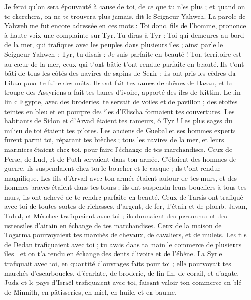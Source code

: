 \begin{multicols}{2}
Je ferai qu'on sera épouvanté à cause de toi, de ce que tu n'es plus ; et quand on te cherchera, on ne te trouvera plus jamais, dit le Seigneur Yahweh.
\VerseOne{}La parole de Yahweh me fut encore adressée en ces mots :
Toi donc, fils de l’homme, prononce à haute voix une complainte sur Tyr.
Tu diras à Tyr : Toi qui demeures au bord de la mer, qui trafiques avec les peuples dans plusieurs îles ; ainsi parle le Seigneur Yahweh : Tyr, tu disais : Je suis parfaite en beauté !
Ton territoire est au cœur de la mer, ceux qui t'ont bâtie t'ont rendue parfaite en beauté.
Ils t'ont bâti de tous les côtés des navires de sapins de Senir ; ils ont pris les cèdres du Liban pour te faire des mâts.
Ils ont fait tes rames de chênes de Basan, et la troupe des Assyriens a fait tes bancs d'ivoire, apporté des îles de Kittim.
Le fin lin d'Egypte, avec des broderies, te servait de voiles et de pavillon ; des étoffes teintes en bleu et en pourpre des îles d’Elischa formaient tes couvertures.
Les habitants de Sidon et d'Arvad étaient tes rameurs, ô Tyr ! Les plus sages du milieu de toi étaient tes pilotes.
Les anciens de Guebal et ses hommes experts furent parmi toi, réparant tes brèches ; tous les navires de la mer, et leurs mariniers étaient chez toi, pour faire l’échange de tes marchandises.
Ceux de Perse, de Lud, et de Puth servaient dans ton armée. C’étaient des hommes de guerre, ils suspendaient chez toi le bouclier et le casque ; ils t'ont rendue magnifique.
Les fils d'Arvad avec ton armée étaient autour de tes murs, et des hommes braves étaient dans tes tours ; ils ont suspendu leurs boucliers à tous tes murs, ils ont achevé de te rendre parfaite en beauté.
Ceux de Tarsis ont trafiqué avec toi de toutes sortes de richesses, d’argent, de fer, d’étain et de plomb.
Javan, Tubal, et Méschec trafiquaient avec toi ; ils donnaient des personnes et des ustensiles d’airain en échange de tes marchandises.
Ceux de la maison de Togarma pourvoyaient tes marchés de chevaux, de cavaliers, et de mulets.
Les fils de Dedan trafiquaient avec toi ; tu avais dans ta main le commerce de plusieurs îles ; et on t'a rendu en échange des dents d'ivoire et de l'ébène.
La Syrie trafiquait avec toi, en quantité d'ouvrages faits pour toi ; elle pourvoyait tes marchés d’escarboucles, d’écarlate, de broderie, de fin lin, de corail, et d’agate.
Juda et le pays d'Israël trafiquaient avec toi, faisant valoir ton commerce en blé de Minnith, en pâtisseries, en miel, en huile, et en baume.

\end{multicols}

